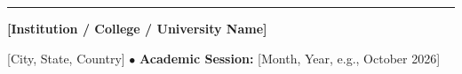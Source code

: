 \documentclass[11pt,a4paper,oneside]{report}
\begin{document}
\begin{titlepage}
    \vfill
    \rule{0.85\textwidth}{1.0pt}
    \vspace{0.5cm}
    
    {\normalsize \bfseries [Institution / College / University Name]}\par
    \vspace{0.15cm}
    {\small [City, State, Country] \quad $\bullet$ \quad \textbf{Academic Session:} [Month, Year, e.g., October 2026]}\par
    \vspace*{0.2cm}
\end{titlepage}

\setcounter{page}{1}


\clearpage

\tableofcontents
\clearpage

\setcounter{page}{1}

















\end{document}
